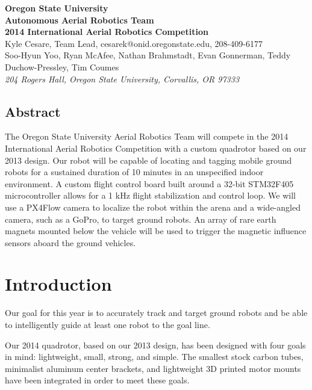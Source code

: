 \documentclass[12pt,letterpaper]{article} \usepackage[margin=1in]{geometry}
\begin{document}
\begin{center}
	{\bf\Large Oregon State University \\
		Autonomous Aerial Robotics Team \\
		2014 International Aerial Robotics Competition \\ [1em]
	}
	{\footnotesize Kyle Cesare, Team Lead, cesarek@onid.oregonstate.edu, 208-409-6177 \\
		Soo-Hyun Yoo, Ryan McAfee, Nathan Brahmstadt, Evan Gonnerman, Teddy Duchow-Pressley, Tim Coumes  \\ [0.5em]
		\emph{204 Rogers Hall, Oregon State University, Corvallis, OR 97333}
	}
\end{center}


\begin{center} \begin{minipage}{5.5in}

\section*{Abstract}

The Oregon State University Aerial Robotics Team will compete in the 2014
International Aerial Robotics Competition with a custom quadrotor based on our
2013 design. Our robot will be capable of locating and tagging mobile ground
robots for a sustained duration of 10 minutes in an unspecified indoor
environment. A custom flight control board built around a 32-bit STM32F405
microcontroller allows for a 1 kHz flight stabilization and control loop. We will
use a PX4Flow camera to localize the robot within the arena and a wide-angled
camera, such as a GoPro, to target ground robots. An array of rare earth magnets
mounted below the vehicle will be used to trigger the magnetic influence sensors
aboard the ground vehicles.

\end{minipage} \end{center}



\section*{Introduction}

Our goal for this year is to accurately track and target ground robots and be
able to intelligently guide at least one robot to the goal line.

Our 2014 quadrotor, based on our 2013 design, has been designed with four goals
in mind: lightweight, small, strong, and simple. The smallest stock carbon
tubes, minimalist aluminum center brackets, and lightweight 3D printed motor
mounts have been integrated in order to meet these goals.
\end{document}
